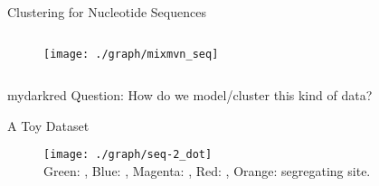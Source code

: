 \documentclass{beamer}
\begin{document}
\begin{frame}{Clustering for Nucleotide Sequences}
\begin{columns}
\begin{column}{0.5\textwidth}
\begin{figure}
  \vspace{-1.0cm}
  \texttt{[image: ./graph/mixmvn\_seq]}
\end{figure}
\end{column}

\end{columns}

\begin{center}
\begin{color}{mydarkred}
Question: How do we model/cluster this kind of data?
\end{color}
\end{center}

\end{frame}


\begin{frame}{A Toy Dataset}

\vspace{-0.5cm}
\begin{figure}
  \texttt{[image: ./graph/seq-2\_dot]}
  \\
  {\tiny Green: , Blue: , Magenta: , Red: ,
         Orange: segregating site.}
\end{figure}

\end{frame}

\end{document}
